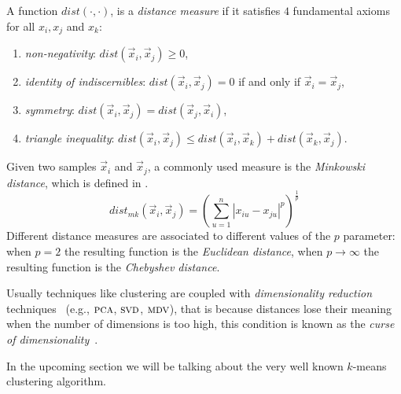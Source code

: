 A function $dist(\cdot, \cdot)$, is a \emph{distance measure} if it satisfies $4$ fundamental axioms
for all $x_i, x_j$ and $x_k$:
\begin{enumerate}
	\item \emph{non-negativity}: $dist(\vec{x}_i, \vec{x}_j) \geq 0$,
	\item \emph{identity of indiscernibles}: $dist(\vec{x}_i, \vec{x}_j) = 0$ if and only if
		$\vec{x}_i = \vec{x}_j$,
	\item \emph{symmetry}: $dist(\vec{x}_i, \vec{x}_j) = dist(\vec{x}_j, \vec{x}_i)$,
	\item \emph{triangle inequality}: $dist(\vec{x}_i, \vec{x}_j) \leq dist(\vec{x}_i,
		\vec{x}_k) + dist(\vec{x}_k, \vec{x}_j)$.
\end{enumerate}
Given two samples $\vec{x}_i$ and $\vec{x}_j$, a commonly used measure is the \emph{Minkowski
distance}, which is defined in .
\begin{equation}
	\label{eq:mkd}
	dist_{mk}(\vec{x}_i, \vec{x}_j) = \left(\sum_{u = 1}^n|x_{iu} - x_{ju}|^p\right)^\frac{1}{p}
\end{equation}
Different distance measures are associated to different values of the $p$ parameter: when $p = 2$ the resulting function is the \emph{Euclidean distance}, when $p \rightarrow \infty$ the resulting function is the \emph{Chebyshev distance}.

Usually techniques like clustering are coupled with \emph{dimensionality reduction}
techniques~\cite{tang2008-clustering, allaoui2020-clustering} (e.g., $\textsc{pca}$, $\textsc{svd}$,
$\textsc{mdv}$), that is because distances lose their meaning when the number of dimensions is too
high, this condition is known as the \emph{curse of dimensionality}~\cite{aggrawal2001-curseofdimensionality}.

In the upcoming section we will be talking about the very well known $k$-means clustering algorithm.

